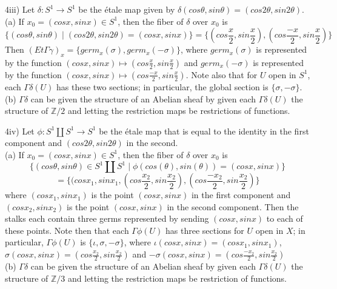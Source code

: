 4iii) Let $\delta:S^1 \rightarrow S^1$ be the \'etale map given by $\delta(cos\theta, sin\theta)=(cos2\theta, sin2\theta)$.\\

(a) If $x_0 = (cosx,sinx) \in S^1$, then the fiber of $\delta$ over $x_0$ is \[\{(cos\theta, sin\theta) \mid (cos2\theta, sin2\theta)=(cosx, sinx)\} = \{(cos\frac{x}{2}, sin\frac{x}{2}), (cos\frac{-x}{2}, sin\frac{x}{2})\}\]
Then $(Et \Gamma \gamma)_x = \{germ_x(\sigma), germ_x(-\sigma)\}$, where $germ_x(\sigma)$ is represented by the function $(cosx, sinx) \mapsto (cos\frac{x}{2}, sin\frac{x}{2})$ and $germ_x(-\sigma)$ is represented by the function $(cosx, sinx) \mapsto  (cos\frac{-x}{2}, sin\frac{x}{2})$. Note also that for $U$ open in $S^1$, each $\Gamma \delta (U)$ has these two sections; in particular, the global section is $\{\sigma, -\sigma\}$.\\

(b) $\Gamma \delta$ can be given the structure of an Abelian sheaf by given each $\Gamma \delta (U)$ the structure of $\mathbb{Z}/2$ and letting the restriction maps be restrictions of functions. 

\newpage

4iv) Let $\phi: S^1 \coprod S^1 \rightarrow S^1$ be the \'etale map that is equal to the identity in the first component and $(cos2\theta, sin2\theta)$ in the second. \\

(a) If $x_0 = (cosx,sinx) \in S^1$, then the fiber of $\delta$ over $x_0$ is \[\{(cos\theta, sin\theta) \in  S^1 \coprod S^1  \mid \phi(cos(\theta), sin(\theta))=(cosx, sinx)\}\]
\[ = \{(cosx_1, sinx_1, (cos\frac{x_2}{2}, sin\frac{x_2}{2}), (cos\frac{-x_2}{2}, sin\frac{x_2}{2})\}\]
where $(cosx_1, sinx_1)$ is the point $(cosx,sinx)$ in the first component and $(cosx_2,sinx_2)$ is the point $(cosx,sinx)$ in the second component. Then the stalks each contain three germs represented by sending $(cosx, sinx)$ to each of these points. 
Note then that each $\Gamma \phi (U)$ has three sections for $U$ open in $X$; in particular, $\Gamma \phi (U)$ is $\{\iota, \sigma, -\sigma\}$, where $\iota(cosx, sinx) = (cosx_1,sinx_1)$, $\sigma(cosx,sinx)=(cos\frac{x_2}{2}, sin\frac{x_2}{2})$ and $-\sigma(cosx,sinx)= (cos\frac{-x_2}{2}, sin\frac{x_2}{2})$ \\

(b) $\Gamma \delta$ can be given the structure of an Abelian sheaf by given each $\Gamma \delta (U)$ the structure of $\mathbb{Z}/3$ and letting the restriction maps be restriction of functions.



